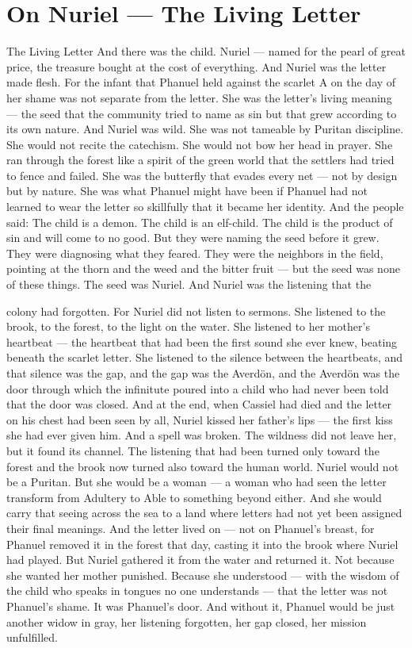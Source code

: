 \documentclass[12pt,openany]{book}
\begin{document}
\chapter{On Nuriel --- The Living Letter}

The Living Letter And there was the child. Nuriel --- named for the pearl of great price, the treasure bought at the cost of everything. And Nuriel was the letter made flesh. For the infant that Phanuel held against the scarlet A on the day of her shame was not separate from the letter. She was the letter's living meaning --- the seed that the community tried to name as sin but that grew according to its own nature. And Nuriel was wild. She was not tameable by Puritan discipline. She would not recite the catechism. She would not bow her head in prayer. She ran through the forest like a spirit of the green world that the settlers had tried to fence and failed. She was the butterfly that evades every net --- not by design but by nature. She was what Phanuel might have been if Phanuel had not learned to wear the letter so skillfully that it became her identity. And the people said: The child is a demon. The child is an elf-child. The child is the product of sin and will come to no good. But they were naming the seed before it grew. They were diagnosing what they feared. They were the neighbors in the field, pointing at the thorn and the weed and the bitter fruit --- but the seed was none of these things. The seed was Nuriel. And Nuriel was the listening that the


colony had forgotten. For Nuriel did not listen to sermons. She listened to the brook, to the forest, to the light on the water. She listened to her mother's heartbeat --- the heartbeat that had been the first sound she ever knew, beating beneath the scarlet letter. She listened to the silence between the heartbeats, and that silence was the gap, and the gap was the Averdön, and the Averdön was the door through which the infinitute poured into a child who had never been told that the door was closed. And at the end, when Cassiel had died and the letter on his chest had been seen by all, Nuriel kissed her father's lips --- the first kiss she had ever given him. And a spell was broken. The wildness did not leave her, but it found its channel. The listening that had been turned only toward the forest and the brook now turned also toward the human world. Nuriel would not be a Puritan. But she would be a woman --- a woman who had seen the letter transform from Adultery to Able to something beyond either. And she would carry that seeing across the sea to a land where letters had not yet been assigned their final meanings. And the letter lived on --- not on Phanuel's breast, for Phanuel removed it in the forest that day, casting it into the brook where Nuriel had played. But Nuriel gathered it from the water and returned it. Not because she wanted her mother punished. Because she understood --- with the wisdom of the child who speaks in tongues no one understands --- that the letter was not Phanuel's shame. It was Phanuel's door. And without it, Phanuel would be just another widow in gray, her listening forgotten, her gap closed, her mission unfulfilled.
\end{document}
